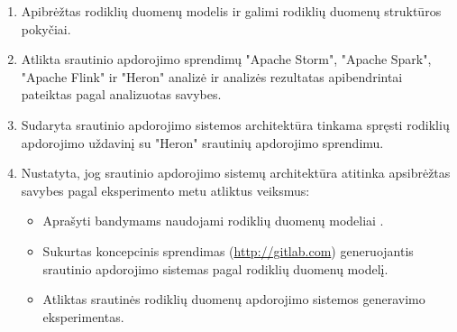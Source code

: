 \documentclass{VUMIFPSbakalaurinis}
\begin{document}
\begin{enumerate}
    \item Apibrėžtas rodiklių duomenų modelis ir galimi rodiklių duomenų struktūros pokyčiai.
    \item Atlikta srautinio apdorojimo sprendimų "Apache Storm", "Apache Spark", "Apache Flink" ir "Heron" analizė ir analizės rezultatas apibendrintai pateiktas pagal analizuotas savybes. 
    \item Sudaryta srautinio apdorojimo sistemos architektūra tinkama spręsti rodiklių apdorojimo uždavinį su "Heron" srautinių apdorojimo sprendimu. 
    \item Nustatyta, jog srautinio apdorojimo sistemų architektūra atitinka apsibrėžtas savybes pagal eksperimento metu atliktus veiksmus:
    \begin{itemize}
        \item Aprašyti bandymams naudojami rodiklių duomenų modeliai .
        \item Sukurtas koncepcinis sprendimas (\url{http://gitlab.com}) generuojantis srautinio apdorojimo sistemas pagal rodiklių duomenų modelį.
        \item Atliktas srautinės rodiklių duomenų apdorojimo sistemos generavimo eksperimentas. 
    \end{itemize} 
\end{enumerate}
\end{document}
